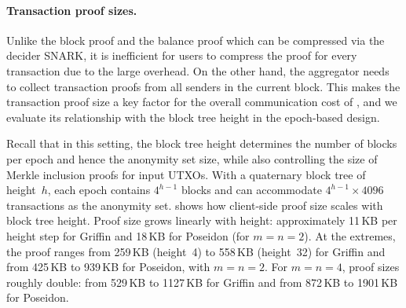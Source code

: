 \begin{table}[!ht]
  \centering
  \small
  \renewcommand*{\arraystretch}{1.1}
  \renewcommand*{\cmidrulesep}{0}
  \renewcommand*{\aboverulesep}{0pt}
  \renewcommand*{\belowrulesep}{0pt}
\end{table}

\paragraph{Transaction proof sizes.}
Unlike the block proof and the balance proof which can be compressed via the decider SNARK, it is inefficient for users to compress the proof for every transaction due to the large overhead.
On the other hand, the aggregator needs to collect transaction proofs from all senders in the current block.
This makes the transaction proof size a key factor for the overall communication cost of \Protocol, and we evaluate its relationship with the block tree height in the epoch-based design.

Recall that in this setting, the block tree height determines the number of blocks per epoch and hence the anonymity set size, while also controlling the size of Merkle inclusion proofs for input \acp{UTXO}.
With a quaternary block tree of height~$h$, each epoch contains $4^{h-1}$ blocks and can accommodate $4^{h-1} \times 4096$ transactions as the anonymity set.
 shows how client-side proof size scales with block tree height.
Proof size grows linearly with height: approximately 11\,KB per height step for Griffin and 18\,KB for Poseidon (for $m{=}n{=}2$).
At the extremes, the proof ranges from 259\,KB (height~4) to 558\,KB (height~32) for Griffin and from 425\,KB to 939\,KB for Poseidon, with $m{=}n{=}2$.
For $m{=}n{=}4$, proof sizes roughly double: from 529\,KB to 1127\,KB for Griffin and from 872\,KB to 1901\,KB for Poseidon.

